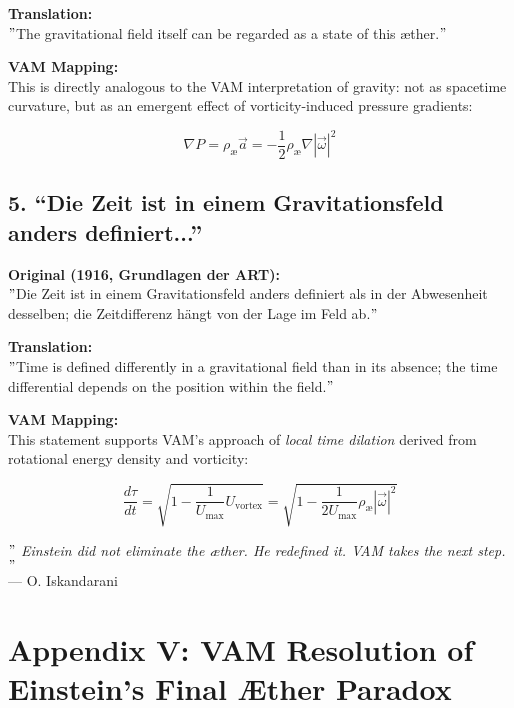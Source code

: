 \documentclass[preprint,notitlepage]{revtex4-2}
\renewcommand{\grqq}{``}
\begin{document}
    \textbf{Translation:} \\
    \("\)The gravitational field itself can be regarded as a state of this æther.\("\)

    \textbf{VAM Mapping:} \\
    This is directly analogous to the VAM interpretation of gravity: not as spacetime curvature, but as an emergent effect of vorticity-induced pressure gradients:

    \[
    \nabla P = \rho_\text{\ae} \vec{a} = -\frac{1}{2} \rho_\text{\ae} \nabla |\vec{\omega}|^2
    \]

    \subsection*{5. \grqq Die Zeit ist in einem Gravitationsfeld anders definiert...\textquotedblright}
    \textbf{Original (1916, Grundlagen der ART):} \\
    \("\)Die Zeit ist in einem Gravitationsfeld anders definiert als in der Abwesenheit desselben; die Zeitdifferenz hängt von der Lage im Feld ab.\("\)

    \textbf{Translation:} \\
    \("\)Time is defined differently in a gravitational field than in its absence; the time differential depends on the position within the field.\("\)

    \textbf{VAM Mapping:} \\
    This statement supports VAM's approach of \emph{local time dilation} derived from rotational energy density and vorticity:

    \[
    \frac{d\tau}{dt} = \sqrt{1 - \frac{1}{U_\text{max}} U_{\text{vortex}}} = \sqrt{1 - \frac{1}{2U_\text{max}} \rho_\text{\ae} |\vec{\omega}|^2}
    \]

    \bigskip
    \textit{ \("\) Einstein did not eliminate the æther. He redefined it. VAM takes the next step. \("\)}\\
    \hfill — O. Iskandarani\\

\section*{Appendix V: VAM Resolution of Einstein’s Final Æther Paradox}
\label{appendix:final-aether}

    \vspace{-0.5em}
\end{document}
